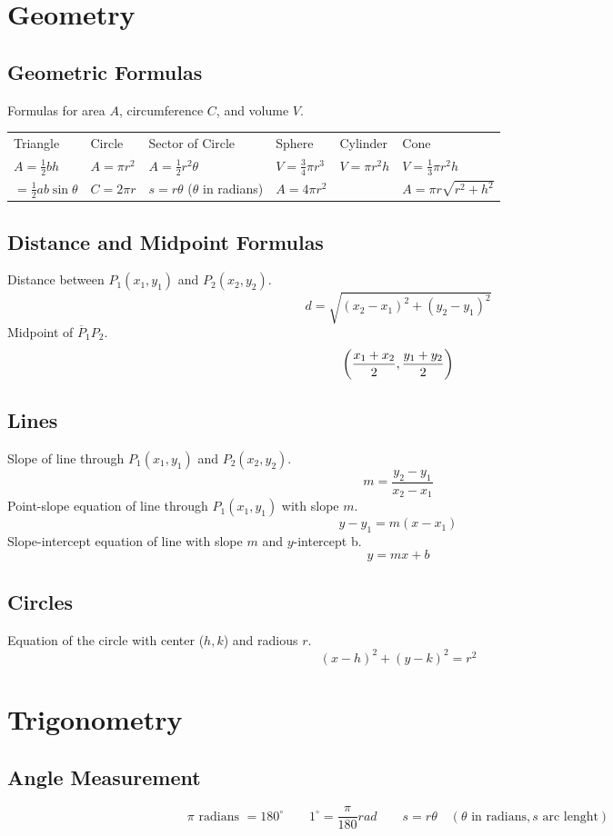\section{Geometry}
\subsection{Geometric Formulas}
Formulas for area $A$, circumference $C$, and volume $V$.
\begin{center}
  \begin{tabular}{llllll}
    Triangle & Circle & Sector of Circle & Sphere & Cylinder & Cone\\[0.3cm]
    $A = \frac{1}{2}bh$ & $A = \pi r^2$ & $A = \frac{1}{2}r^2\theta$ & $V = \frac34 \pi r^3$ & $V = \pi r^2 h$ & $V = \frac13 \pi r^2 h$ \\[0.3cm]
    $= \frac{1}{2}ab \sin \theta$ & $C = 2\pi r$ & $s = r\theta$ ($\theta$ in radians) & $A = 4 \pi r^2$ & & $A = \pi r \sqrt{r^2 + h^2}$
  \end{tabular}
\end{center}

\subsection{Distance and Midpoint Formulas}
Distance between $P_1(x_1, y_1)$ and $P_2(x_2, y_2)$.
\[d = \sqrt{(x_2 - x_1)^2 + (y_2 - y_1)^2}\]
Midpoint of $\overline P_1 P_2$.
\[\parens*{\frac{x_1 + x_2}2 , \frac{y_1 + y_2}2}\]

\subsection{Lines}
Slope of line through $P_1(x_1, y_1)$ and $P_2(x_2, y_2)$.
\[m = \frac{y_2 - y_1}{x_2 - x_1}\]
Point-slope equation of line through $P_1(x_1, y_1)$ with slope $m$.
\[y - y_1 = m(x - x_1)\]
Slope-intercept equation of line with slope $m$ and $y$-intercept b.
\[y = mx + b\]

\subsection{Circles}
Equation of the circle with center ($h,k$) and radious $r$.
\[(x - h)^2 + (y-k)^2 = r^2\]

\section{Trigonometry}
\subsection{Angle Measurement}
\[\pi \text{ radians } = 180^{\circ} \qquad 1^{\circ} = \frac{\pi}{180}rad \qquad s = r \theta \quad (\theta \text{ in radians}, s \text{ arc lenght})\]

